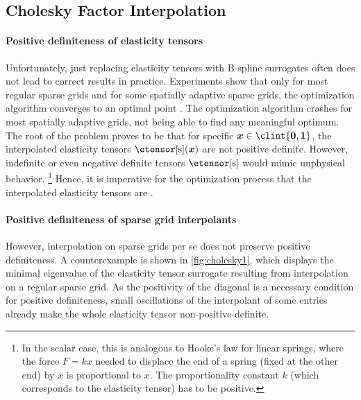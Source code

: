 \subsection{Cholesky Factor Interpolation}
\label{sec:623cholesky}

\paragraph{Positive definiteness of elasticity tensors}

Unfortunately, just replacing elasticity tensors with
B-spline surrogates often does not lead to correct results in practice.
Experiments show that only for most regular sparse grids and
for some spatially adaptive sparse grids,
the optimization algorithm converges to an optimal point
\cite{Valentin16Hierarchical}.
The optimization algorithm crashes for most spatially adaptive grids,
not being able to find any meaningful optimum.
%
The root of the problem proves to be that for specific
$\*x \in \clint{\*0, \*1}$,
the interpolated elasticity tensors $\etensor[\sparse](\*x)$ are not
positive definite.
However, indefinite or even negative definite tensors $\etensor[\sparse]$
would mimic unphysical behavior.%
\footnote{%
  In the scalar case, this is analogous to Hooke's law for linear springs,
  where the force $F = kx$ needed to displace the end of a spring
  (fixed at the other end) by $x$ is proportional to $x$.
  The proportionality constant $k$ (which corresponds to the elasticity tensor)
  has to be positive.%
}
Hence, it is imperative for the optimization process that
the interpolated elasticity tensors are \spd.

\paragraph{Positive definiteness of sparse grid interpolants}

However, interpolation on sparse grids per se does not preserve
positive definiteness.
A counterexample is shown in \cref{fig:cholesky1},
which displays the minimal eigenvalue of the elasticity tensor surrogate
resulting from interpolation on a regular sparse grid.
As the positivity of the diagonal is a necessary condition
for positive definiteness,
small oscillations of the interpolant of some entries
already make the whole elasticity tensor non-positive-definite.

